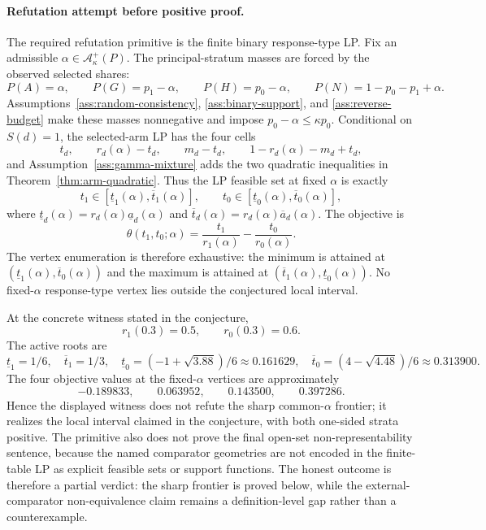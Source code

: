 \documentclass[11pt]{article}
\theoremstyle{definition}
\theoremstyle{plain}
\theoremstyle{remark}
\begin{document}
\paragraph{Refutation attempt before positive proof.}
The required refutation primitive is the finite binary response-type LP.  Fix
an admissible \(\alpha\in\mathcal A_\kappa^+(P)\).  The principal-stratum
masses are forced by the observed selected shares:
\[
  P(A)=\alpha,\qquad P(G)=p_1-\alpha,\qquad P(H)=p_0-\alpha,\qquad P(N)=1-p_0-p_1+\alpha .
\]
Assumptions~\ref{ass:random-consistency}, \ref{ass:binary-support}, and
\ref{ass:reverse-budget} make these masses nonnegative and impose
\(p_0-\alpha\le \kappa p_0\).  Conditional on \(S(d)=1\), the selected-arm LP
has the four cells
\[
  t_d,\qquad r_d(\alpha)-t_d,\qquad m_d-t_d,\qquad
  1-r_d(\alpha)-m_d+t_d ,
\]
and Assumption~\ref{ass:gamma-mixture} adds the two quadratic inequalities in
Theorem~\ref{thm:arm-quadratic}.  Thus the LP feasible set at fixed \(\alpha\)
is exactly
\[
  t_1\in[\underline t_1(\alpha),\overline t_1(\alpha)],
  \qquad
  t_0\in[\underline t_0(\alpha),\overline t_0(\alpha)],
\]
where \(\underline t_d(\alpha)=r_d(\alpha)\underline a_d(\alpha)\) and
\(\overline t_d(\alpha)=r_d(\alpha)\overline a_d(\alpha)\).  The objective is
\[
  \theta(t_1,t_0;\alpha)
  =
  \frac{t_1}{r_1(\alpha)}-\frac{t_0}{r_0(\alpha)} .
\]
The vertex enumeration is therefore exhaustive: the minimum is attained at
\((\underline t_1(\alpha),\overline t_0(\alpha))\) and the maximum is attained
at \((\overline t_1(\alpha),\underline t_0(\alpha))\).  No fixed-\(\alpha\)
response-type vertex lies outside the conjectured local interval.

At the concrete witness stated in the conjecture,
\[
  r_1(0.3)=0.5,\qquad r_0(0.3)=0.6.
\]
The active roots are
\[
  \underline t_1=1/6,\quad \overline t_1=1/3,\quad
  \underline t_0=(-1+\sqrt{3.88})/6\approx 0.161629,\quad
  \overline t_0=(4-\sqrt{4.48})/6\approx 0.313900 .
\]
The four objective values at the fixed-\(\alpha\) vertices are approximately
\[
  -0.189833,\qquad 0.063952,\qquad 0.143500,\qquad 0.397286 .
\]
Hence the displayed witness does not refute the sharp common-\(\alpha\)
frontier; it realizes the local interval claimed in the conjecture, with both
one-sided strata positive.  The primitive also does not prove the final
open-set non-representability sentence, because the named comparator geometries
are not encoded in the finite-table LP as explicit feasible sets or support
functions.  The honest outcome is therefore a partial verdict: the sharp
frontier is proved below, while the external-comparator non-equivalence claim
remains a definition-level gap rather than a counterexample.
\end{document}
